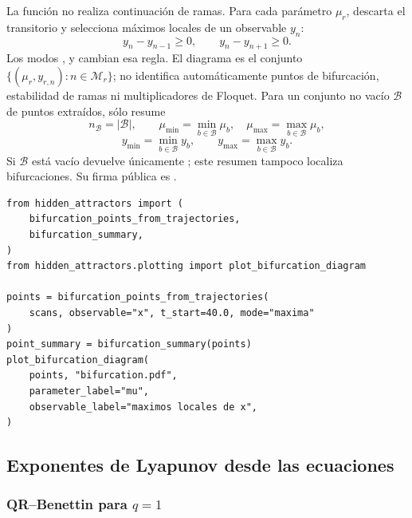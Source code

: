 La función  no realiza
continuación de ramas. Para cada parámetro \(\mu_r\), descarta el transitorio y
selecciona máximos locales de un observable \(y_n\):
\[
 y_n-y_{n-1}\geq0,\qquad y_n-y_{n+1}\geq0.
\]
Los modos ,  y  cambian esa
regla. El diagrama es el conjunto
\(\{(\mu_r,y_{r,n}):n\in\mathcal M_r\}\); no identifica automáticamente
puntos de bifurcación, estabilidad de ramas ni multiplicadores de Floquet.
Para un conjunto no vacío \(\mathcal B\) de puntos extraídos,
 sólo resume
\[
 n_{\mathcal B}=|\mathcal B|,\qquad
 \mu_{\min}=\min_{b\in\mathcal B}\mu_b,\quad
 \mu_{\max}=\max_{b\in\mathcal B}\mu_b,
\]
\[
 y_{\min}=\min_{b\in\mathcal B}y_b,\qquad
 y_{\max}=\max_{b\in\mathcal B}y_b.
\]
Si \(\mathcal B\) está vacío devuelve únicamente
; este resumen tampoco localiza bifurcaciones.
Su firma pública es .

\begin{verbatim}
from hidden_attractors import (
    bifurcation_points_from_trajectories,
    bifurcation_summary,
)
from hidden_attractors.plotting import plot_bifurcation_diagram

points = bifurcation_points_from_trajectories(
    scans, observable="x", t_start=40.0, mode="maxima"
)
point_summary = bifurcation_summary(points)
plot_bifurcation_diagram(
    points, "bifurcation.pdf",
    parameter_label="mu",
    observable_label="maximos locales de x",
)
\end{verbatim}

\subsection{Exponentes de Lyapunov desde las ecuaciones}

\subsubsection{QR--Benettin para \(q=1\)}

